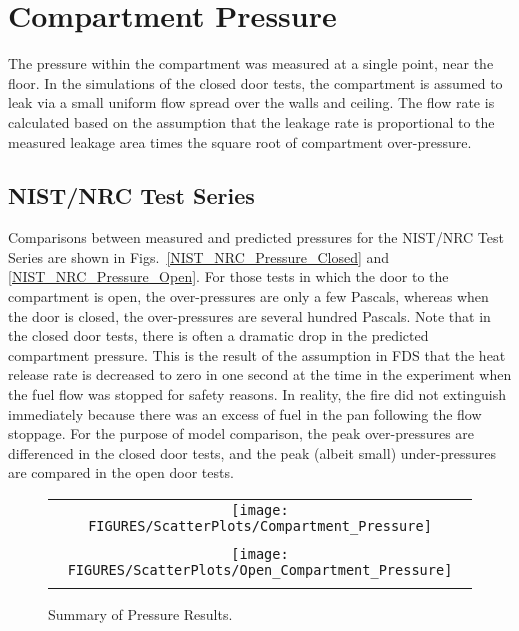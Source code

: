 \chapter{Compartment Pressure}

The pressure within the compartment was measured at a single point, near the floor.
In the simulations of the closed door tests, the compartment is assumed to leak via a small uniform flow spread
over the walls and ceiling.  The flow rate is calculated based on the assumption that the leakage rate is proportional
to the measured leakage area times the square root of compartment over-pressure.


\section{NIST/NRC Test Series}

Comparisons between measured and predicted pressures for the NIST/NRC Test Series are shown
in Figs.~\ref{NIST_NRC_Pressure_Closed} and \ref{NIST_NRC_Pressure_Open}.
For those tests in which the door to the compartment is
open, the over-pressures are only a few Pascals, whereas when the door is closed, the over-pressures are several hundred Pascals.
Note that in the closed door tests, there is often a dramatic drop in the predicted compartment pressure.
This is the result of the assumption in FDS that the heat release rate is decreased to zero in one second at the time
in the experiment when the fuel flow was stopped for safety reasons.  In reality, the fire did not extinguish
immediately because there was an excess of fuel in the pan following the flow stoppage.
For the purpose of model comparison, the peak over-pressures are differenced in the closed door tests,
and the peak (albeit small) under-pressures are compared in the open door tests.



\begin{figure}[p]
\begin{center}
\begin{tabular}{c}
\texttt{[image: FIGURES/ScatterPlots/Compartment\_Pressure]} \\
\vspace{0.25in} \\
\texttt{[image: FIGURES/ScatterPlots/Open\_Compartment\_Pressure]} \\
\vspace{0.25in}
\end{tabular}
\caption{Summary of Pressure Results.}
\end{center}
\end{figure}

\clearpage
